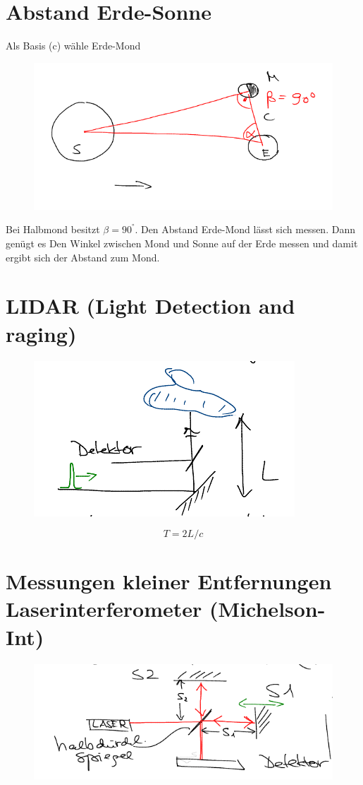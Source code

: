 \documentclass[a4paper,10pt]{scrartcl}
\begin{document}
\begin{enumerate}[a]
\section*{Abstand Erde-Sonne}
Als Basis (c) wähle Erde-Mond
\begin{figure}
 \includegraphics{fig9.png}
\end{figure}
Bei Halbmond besitzt $\beta=90^°$.  Den Abstand Erde-Mond lässt sich messen. Dann genügt es Den Winkel zwischen Mond und Sonne auf der Erde messen und damit ergibt sich der Abstand zum Mond.

\section*{LIDAR (Light Detection and raging)}
\begin{figure}[h]
 \includegraphics{fig10.png}
\end{figure}
\[
T=2L/c
\]

\section*{Messungen kleiner Entfernungen Laserinterferometer (Michelson-Int)}

\begin{figure}[h]
 \includegraphics{fig11.png}
\end{figure}


\end{enumerate}
\end{document}
